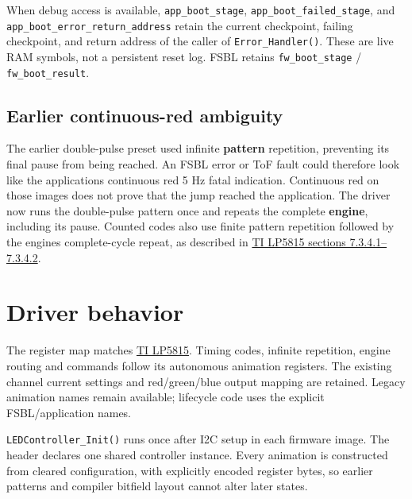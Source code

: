 \documentclass[10pt,a4paper,oneside]{report}
\begin{document}
When debug access is available, \texttt{app\_\allowbreak{}boot\_\allowbreak{}stage}, \texttt{app\_\allowbreak{}boot\_\allowbreak{}failed\_\allowbreak{}stage}, and \texttt{app\_\allowbreak{}boot\_\allowbreak{}error\_\allowbreak{}return\_\allowbreak{}address} retain the current checkpoint, failing checkpoint, and return address of the caller of \texttt{Error\_\allowbreak{}Handler()}. These are live RAM symbols, not a persistent reset log. FSBL retains \texttt{fw\_\allowbreak{}boot\_\allowbreak{}stage} / \texttt{fw\_\allowbreak{}boot\_\allowbreak{}result}.

\subsection{Earlier continuous-red ambiguity}\label{wiki-firmware-status-led--earlier-continuous-red-ambiguity}

The earlier double-pulse preset used infinite \textbf{pattern} repetition, preventing its final pause from being reached. An FSBL error or ToF fault could therefore look like the application\textquotesingle s continuous red 5 Hz fatal indication. Continuous red on those images does not prove that the jump reached the application. The driver now runs the double-pulse pattern once and repeats the complete \textbf{engine}, including its pause. Counted codes also use finite pattern repetition followed by the engine\textquotesingle s complete-cycle repeat, as described in \href{https://www.ti.com/lit/gpn/lp5815}{TI LP5815 sections 7.3.4.1--7.3.4.2}.

\section{Driver behavior}\label{wiki-firmware-status-led--driver-behavior}

The register map matches \href{https://www.ti.com/lit/gpn/lp5815}{TI LP5815}. Timing codes, infinite repetition, engine routing and commands follow its autonomous animation registers. The existing channel current settings and red/green/blue output mapping are retained. Legacy animation names remain available; lifecycle code uses the explicit FSBL/application names.

\texttt{LEDController\_\allowbreak{}Init()} runs once after I2C setup in each firmware image. The header declares one shared controller instance. Every animation is constructed from cleared configuration, with explicitly encoded register bytes, so earlier patterns and compiler bitfield layout cannot alter later states.
\end{document}
